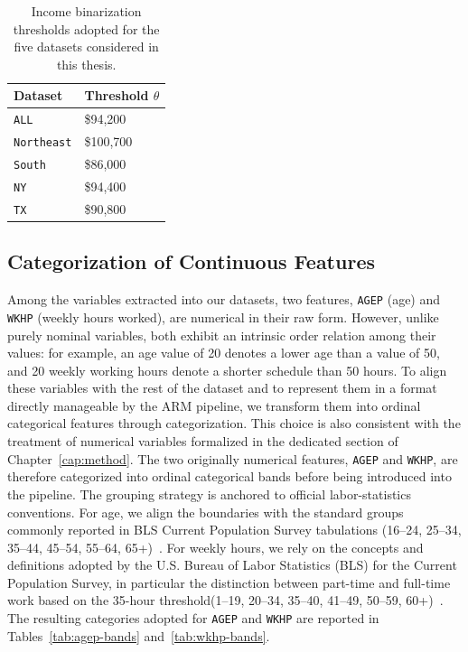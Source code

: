 \begin{table}[htbp]
\centering
\renewcommand{\arraystretch}{1.2}
\caption{Income binarization thresholds adopted for the five datasets considered in this thesis.}
\label{tab:income-thresholds}
\begin{tabular}{>{\raggedright\arraybackslash}p{} p{}}
  \toprule
  \textbf{Dataset} & \textbf{Threshold $\theta$} \\
  \midrule
  \texttt{ALL} & \$94{,}200 \\
  \texttt{Northeast} & \$100{,}700 \\
  \texttt{South} & \$86{,}000 \\
  \texttt{NY} & \$94{,}400 \\
  \texttt{TX} & \$90{,}800 \\
  \bottomrule
\end{tabular}
\renewcommand{\arraystretch}{1.0}
\end{table}

\subsection{Categorization of Continuous Features}
\label{sec:discretization}
Among the variables extracted into our datasets, two features, \texttt{AGEP} (age) and \texttt{WKHP} (weekly hours worked), are numerical in their raw form. However, unlike purely nominal variables, both exhibit an intrinsic order relation among their values: for example, an age value of 20 denotes a lower age than a value of 50, and 20 weekly working hours denote a shorter schedule than 50 hours. To align these variables with the rest of the dataset and to represent them in a format directly manageable by the ARM pipeline, we transform them into ordinal categorical features through categorization. This choice is also consistent with the treatment of numerical variables formalized in the dedicated section of Chapter~\ref{cap:method}. The two originally numerical features, \texttt{AGEP} and \texttt{WKHP}, are therefore categorized into ordinal categorical bands before being introduced into the pipeline. The grouping strategy is anchored to official labor-statistics conventions. For age, we align the boundaries with the standard groups commonly reported in BLS Current Population Survey tabulations (16--24, 25--34, 35--44, 45--54, 55--64, 65+)~\cite{bls2026cpsa3}. For weekly hours, we rely on the concepts and definitions adopted by the U.S. Bureau of Labor Statistics (BLS) for the Current Population Survey, in particular the distinction between part-time and full-time work based on the 35-hour threshold(1--19, 20--34, 35--40, 41--49, 50--59, 60+)~\cite{bls2025cpsconcepts}. The resulting categories adopted for \texttt{AGEP} and \texttt{WKHP} are reported in Tables~\ref{tab:agep-bands} and~\ref{tab:wkhp-bands}.

